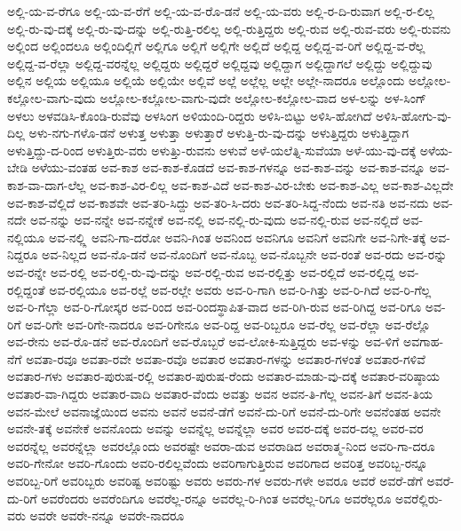 {ಅಲ್ಲಿ-ಯ-ವ-ರೆಗೂ
ಅಲ್ಲಿ-ಯ-ವ-ರೆಗೆ
ಅಲ್ಲಿ-ಯ-ವ-ರೊ-ಡನೆ
ಅಲ್ಲಿ-ಯ-ವರು
ಅಲ್ಲಿ-ರ-ದಿ-ರುವಾಗ
ಅಲ್ಲಿ-ರ-ಲಿಲ್ಲ
ಅಲ್ಲಿ-ರು-ವು-ದಕ್ಕೆ
ಅಲ್ಲಿ-ರು-ವು-ದನ್ನು
ಅಲ್ಲಿ-ರುತ್ತಿ-ರಲಿಲ್ಲ
ಅಲ್ಲಿ-ರುತ್ತಿದ್ದರು
ಅಲ್ಲಿ-ರುವ
ಅಲ್ಲಿ-ರುವ-ವರು
ಅಲ್ಲಿ-ರುವನು
ಅಲ್ಲಿಂದ
ಅಲ್ಲಿಂದಲೂ
ಅಲ್ಲಿಂದಿಲ್ಲಿಗೆ
ಅಲ್ಲಿಗೂ
ಅಲ್ಲಿಗೆ
ಅಲ್ಲಿಗೇ
ಅಲ್ಲಿದೆ
ಅಲ್ಲಿದ್ದ
ಅಲ್ಲಿದ್ದ-ವ-ರಿಗೆ
ಅಲ್ಲಿದ್ದ-ವ-ರೆಲ್ಲ
ಅಲ್ಲಿದ್ದ-ವ-ರೆಲ್ಲಾ
ಅಲ್ಲಿದ್ದ-ವರನ್ನೆಲ್ಲ
ಅಲ್ಲಿದ್ದರು
ಅಲ್ಲಿದ್ದರೆ
ಅಲ್ಲಿದ್ದವು
ಅಲ್ಲಿದ್ದಾಗ
ಅಲ್ಲಿದ್ದಾಗಲೆ
ಅಲ್ಲಿದ್ದು
ಅಲ್ಲಿದ್ದುವು
ಅಲ್ಲಿನ
ಅಲ್ಲಿಯ
ಅಲ್ಲಿಯೂ
ಅಲ್ಲಿಯೆ
ಅಲ್ಲಿಯೇ
ಅಲ್ಲಿವೆ
ಅಲ್ಲೆ
ಅಲ್ಲೆಲ್ಲ
ಅಲ್ಲೇ
ಅಲ್ಲೇ-ನಾದರೂ
ಅಲ್ಲೊಂದು
ಅಲ್ಲೋಲ-ಕಲ್ಲೋಲ-ವಾಗು-ವುದು
ಅಲ್ಲೋಲ-ಕಲ್ಲೋಲ-ವಾಗು-ವುದೇ
ಅಲ್ಲೋಲ-ಕಲ್ಲೋಲ-ವಾದ
ಅಳ-ಲನ್ನು
ಅಳ-ಸಿಂಗ್
ಅಳಲು
ಅಳವಡಿಸಿ-ಕೊಂಡಿ-ರುವೆವು
ಅಳಸಿಂಗ
ಅಳಿಯಂದಿ-ರಿದ್ದರು
ಅಳಿಸಿ-ಬಿಟ್ಟು
ಅಳಿಸಿ-ಹೋಗಿದೆ
ಅಳಿಸಿ-ಹೋಗು-ವು-ದಿಲ್ಲ
ಅಳು-ನಗು-ಗಳೊ-ಡನೆ
ಅಳುತ್ತ
ಅಳುತ್ತಾ
ಅಳುತ್ತಾರೆ
ಅಳುತ್ತಿ-ರು-ವು-ದನ್ನು
ಅಳುತ್ತಿದ್ದರು
ಅಳುತ್ತಿದ್ದಾಗ
ಅಳುತ್ತಿದ್ದು-ದ-ರಿಂದ
ಅಳುತ್ತಿರು-ವರು
ಅಳುತ್ತಿು-ರುವನು
ಅಳುವೆ
ಅಳೆ-ಯಲೆತ್ನಿ-ಸುವೆಯಾ
ಅಳೆ-ಯು-ವು-ದಕ್ಕೆ
ಅಳೆಯ-ಬೇಡಿ
ಅಳೆಯು-ವಂತಹ
ಅವ-ಕಾಶ
ಅವ-ಕಾಶ-ಕೊಡದೆ
ಅವ-ಕಾಶ-ಗಳನ್ನೂ
ಅವ-ಕಾಶ-ವನ್ನು
ಅವ-ಕಾಶ-ವನ್ನೂ
ಅವ-ಕಾಶ-ವಾ-ದಾಗ-ಲೆಲ್ಲ
ಅವ-ಕಾಶ-ವಿರ-ಲಿಲ್ಲ
ಅವ-ಕಾಶ-ವಿದೆ
ಅವ-ಕಾಶ-ವಿರ-ಬೇಕು
ಅವ-ಕಾಶ-ವಿಲ್ಲ
ಅವ-ಕಾಶ-ವಿಲ್ಲದೇ
ಅವ-ಕಾಶ-ವೆಲ್ಲಿದೆ
ಅವ-ಕಾಶವೇ
ಅವ-ತರಿ-ಸಿದ್ದು
ಅವ-ತರಿ-ಸಿ-ದರು
ಅವ-ತರಿ-ಸಿದ್ದ-ನೆಂದು
ಅವ-ನತಿ
ಅವ-ನದು
ಅವ-ನದೇ
ಅವ-ನನ್ನು
ಅವ-ನನ್ನೇ
ಅವ-ನನ್ನೇಕೆ
ಅವ-ನಲ್ಲಿ
ಅವ-ನಲ್ಲಿ-ರು-ವುದು
ಅವ-ನಲ್ಲಿ-ರುವ
ಅವ-ನಲ್ಲಿದೆ
ಅವ-ನಲ್ಲಿಯೂ
ಅವ-ನಲ್ಲ್ಲಿ
ಅವನಿ-ಗಾ-ದರೋ
ಅವನಿ-ಗಿಂತ
ಅವನಿಂದ
ಅವನಿಗೂ
ಅವನಿಗೆ
ಅವನಿಗೇ
ಅವ-ನಿಗೇ-ತಕ್ಕೆ
ಅವ-ನಿದ್ದರೂ
ಅವ-ನಿಲ್ಲದ
ಅವ-ನೊ-ಡನೆ
ಅವ-ನೊಂದಿಗೆ
ಅವ-ನೊಬ್ಬ
ಅವ-ನೊಬ್ಬನೇ
ಅವ-ರಂತೆ
ಅವ-ರದು
ಅವ-ರನ್ನು
ಅವ-ರನ್ನೇ
ಅವ-ರಲ್ಲಿ
ಅವ-ರಲ್ಲಿ-ರು-ವು-ದನ್ನು
ಅವ-ರಲ್ಲಿ-ರುವ
ಅವ-ರಲ್ಲಿತ್ತು
ಅವ-ರಲ್ಲಿದೆ
ಅವ-ರಲ್ಲಿದ್ದ
ಅವ-ರಲ್ಲಿದ್ದಂತೆ
ಅವ-ರಲ್ಲಿಯೂ
ಅವ-ರಲ್ಲೆ
ಅವ-ರಲ್ಲೇ
ಅವರು
ಅವ-ರಿ-ಗಾಗಿ
ಅವ-ರಿ-ಗಿತ್ತು
ಅವ-ರಿ-ಗಿದೆ
ಅವ-ರಿ-ಗೆಲ್ಲ
ಅವ-ರಿ-ಗೆಲ್ಲಾ
ಅವ-ರಿ-ಗೋಸ್ಕರ
ಅವ-ರಿಂದ
ಅವ-ರಿಂದಸ್ಥಾಪಿತ-ವಾದ
ಅವ-ರಿಗಿ-ರುವ
ಅವ-ರಿಗಿದ್ದ
ಅವ-ರಿಗೂ
ಅವ-ರಿಗೆ
ಅವ-ರಿಗೇ
ಅವ-ರಿಗೇ-ನಾದರೂ
ಅವ-ರಿಗೇನೂ
ಅವ-ರಿದ್ದ
ಅವ-ರಿಬ್ಬರೂ
ಅವ-ರೆಲ್ಲ
ಅವ-ರೆಲ್ಲಾ
ಅವ-ರೆಲ್ಲೊ
ಅವ-ರೇನು
ಅವ-ರೊ-ಡನೆ
ಅವ-ರೊಂದಿಗೆ
ಅವ-ರೊಬ್ಬರೆ
ಅವ-ಲೋಕಿ-ಸುತ್ತಿದ್ದರು
ಅವ-ಳನ್ನು
ಅವ-ಳಿಗೆ
ಅವಗಾಹ-ನೆಗೆ
ಅವತಾ-ರವೂ
ಅವತಾ-ರವೇ
ಅವತಾ-ರವೊ
ಅವತಾರ
ಅವತಾರ-ಗಳನ್ನು
ಅವತಾರ-ಗಳಂತೆ
ಅವತಾರ-ಗಳಿವೆ
ಅವತಾರ-ಗಳು
ಅವತಾರ-ಪುರುಷ-ರಲ್ಲಿ
ಅವತಾರ-ಪುರುಷ-ರೆಂದು
ಅವತಾರ-ಮಾಡು-ವು-ದಕ್ಕೆ
ಅವತಾರ-ವರಿಷ್ಠಾಯ
ಅವತಾರ-ವಾ-ಗಿದ್ದರು
ಅವತಾರ-ವಾದಿ
ಅವತಾರ-ವೆಂದು
ಅವತ್ತು
ಅವನ
ಅವನ-ತಿ-ಗೆಲ್ಲ
ಅವನ-ತಿಗೆ
ಅವನ-ತಿಯ
ಅವನ-ಮೇಲೆ
ಅವನಾಜ್ಞೆಯಿಂದ
ಅವನು
ಅವನೆ
ಅವನೆ-ಡೆಗೆ
ಅವನೆ-ದು-ರಿಗೆ
ಅವನೆ-ದು-ರಿಗೇ
ಅವನೆಂತಹ
ಅವನೇ
ಅವನೇ-ತಕ್ಕೆ
ಅವನೇಕೆ
ಅವನೊಂದು
ಅವನ್ನು
ಅವನ್ನೆಲ್ಲ
ಅವನ್ನೆಲ್ಲಾ
ಅವರ
ಅವರ-ದಕ್ಕೆ
ಅವರ-ದಲ್ಲ
ಅವರ-ವರ
ಅವರನ್ನೆಲ್ಲ
ಅವರನ್ನೆಲ್ಲಾ
ಅವರಲ್ಲೊಂದು
ಅವರಷ್ಟೇ
ಅವರಾ-ಡುವ
ಅವರಾಡಿದ
ಅವರಾತ್ಮ-ನಿಂದ
ಅವರಿ-ಗಾ-ದರೂ
ಅವರಿ-ಗೇನೋ
ಅವರಿ-ಗೊಂದು
ಅವರಿ-ರಲಿಲ್ಲವೆಂದು
ಅವರಿಗಾಗುತ್ತಿರುವ
ಅವರಿಗಾದ
ಅವರಿತ್ತ
ಅವರಿಬ್ಬ-ರನ್ನೂ
ಅವರಿಬ್ಬ-ರಿಗೆ
ಅವರಿಬ್ಬರು
ಅವರಿಷ್ಟ
ಅವರಿಷ್ಟು
ಅವರು
ಅವರು-ಗಳ
ಅವರು-ಗಳೇ
ಅವರೂ
ಅವರೆ
ಅವರೆ-ಡೆಗೆ
ಅವರೆ-ದು-ರಿಗೆ
ಅವರೆಂದರು
ಅವರೆಂದಿಗೂ
ಅವರೆಲ್ಲ-ರನ್ನೂ
ಅವರೆಲ್ಲ-ರಿ-ಗಿಂತ
ಅವರೆಲ್ಲ-ರಿಗೂ
ಅವರೆಲ್ಲರೂ
ಅವರೆಲ್ಲಿರು-ವರು
ಅವರೇ
ಅವರೇ-ನನ್ನೂ
ಅವರೇ-ನಾದರೂ
}

